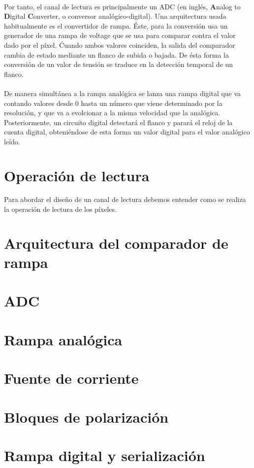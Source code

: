 \paragraph{}
Por tanto, el canal de lectura es principalmente un ADC (en inglés, \textbf{A}nalog
to \textbf{D}igital \textbf{C}onverter, o conversor analógico-digital).
Una arquitectura usada habitualmente es el convertidor de rampa.
Éste, para la conversión usa un generador de una rampa de voltage que se usa para
comparar contra el valor dado por el píxel. Ćuando ambos valores coinciden,
la salida del comparador cambia de estado mediante un flanco de subida o bajada.
De ésta forma la conversión de un valor de tensión se traduce en la detección temporal
de un flanco.

\paragraph{}
De manera simultánea a la rampa analógica se lanza una rampa digital que va contando
valores desde 0 hasta un número que viene determinado por la resolución, y que va a
evolcionar a la misma velocidad que la analógica. Posteriormente, un circuito digital
detectará el flanco y parará el reloj de la cuenta digital, obteniéndose de esta forma
un valor digital para el valor analógico leído.

\section{Operación de lectura}\label{cap:ro_sch_operacion}

\paragraph{}
Para abordar el diseño de un canal de lectura debemos entender como se realiza la
operación de lectura de los píxeles.




\section{Arquitectura del comparador de rampa}

\section{ADC}



\section{Rampa analógica}

\section{Fuente de corriente}

\section{Bloques de polarización}

\section{Rampa digital y serialización}

